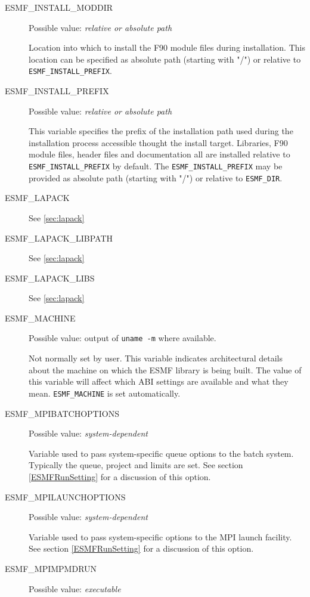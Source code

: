\begin{description}
\item[ESMF\_INSTALL\_MODDIR]
Possible value: {\em relative or absolute path}

Location into which to install the F90 module files during installation. This
location can be specified as absolute path (starting with "/") or relative to
{\tt ESMF\_INSTALL\_PREFIX}.

\item[ESMF\_INSTALL\_PREFIX]
Possible value: {\em relative or absolute path}

This variable specifies the prefix of the installation path used during the
installation process accessible thought the install target. Libraries, F90
module files, header files and documentation all are installed relative to
{\tt ESMF\_INSTALL\_PREFIX} by default. The {\tt ESMF\_INSTALL\_PREFIX} may be
provided as absolute path (starting with "/") or relative to {\tt ESMF\_DIR}.

\item[ESMF\_LAPACK]
See \ref{sec:lapack}

\item[ESMF\_LAPACK\_LIBPATH]
See \ref{sec:lapack}

\item[ESMF\_LAPACK\_LIBS]
See \ref{sec:lapack}

\item[ESMF\_MACHINE]
Possible value: output of {\tt uname -m} where available.

Not normally set by user. This variable indicates architectural details about
the machine on which the ESMF library is being built. The value of this
variable will affect which ABI settings are available and what they mean.
{\tt ESMF\_MACHINE} is set automatically.

\item[ESMF\_MPIBATCHOPTIONS]
Possible value: {\em system-dependent}

Variable used to pass system-specific queue options to the batch system.
Typically the queue, project and limits are set.
See section \ref{ESMFRunSetting} for a discussion of this option.

\item[ESMF\_MPILAUNCHOPTIONS]
Possible value: {\em system-dependent}

Variable used to pass system-specific options to the MPI launch facility.
See section \ref{ESMFRunSetting} for a discussion of this option.

\item[ESMF\_MPIMPMDRUN]
Possible value: {\em executable}


\end{description}
